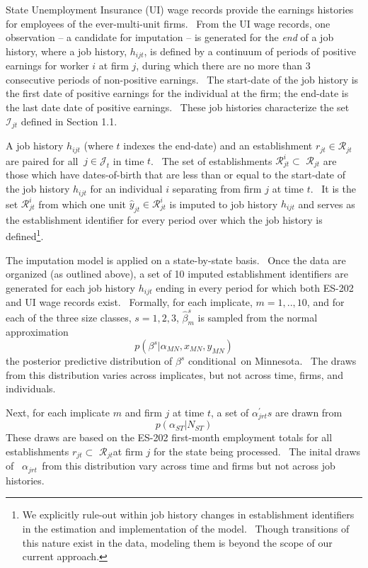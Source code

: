 State Unemployment Insurance (UI) wage records provide the earnings
histories for employees of the ever-multi-unit firms.  \ From the UI wage
records, one observation -- a candidate for imputation --  is generated for
the \emph{end} of a job history, where a job history,  $h_{ijt}$, is defined
by a continuum of periods of positive earnings for worker $i$ at firm $j$,
during which there are no more than 3 consecutive periods of non-positive
earnings. \ The start-date of the job history is the first date of positive
earnings for the individual at the firm; the end-date is the last date date
of positive earnings. \ These job histories characterize the set $\mathcal{I}%
_{jt}$ defined in Section 1.1. \ 

A job history $h_{ijt}$ (where $t$ indexes the end-date) and an
establishment $r_{jt}\in \mathcal{R}_{jt}$ are paired for all $\ j\in 
\mathcal{J}_{t}$ in time $t$. \ The set of establishments  $\mathcal{R}%
_{jt}^{i}\subset $ $\mathcal{R}_{jt}$ are those which have dates-of-birth
that are less than or equal to the start-date of the job history $h_{ijt}$
for an individual $i$ separating from firm $j$ at time $t$. \ It is the set $%
\mathcal{R}_{jt}^{i}$ from which one unit $\hat{y}_{jt}\in \mathcal{R}%
_{jt}^{i}$ is imputed to job history $h_{ijt}$ and serves as the
establishment identifier for every period over which the job history is
defined\footnote{%
We explicitly rule-out within job history changes in establishment
identifiers in the estimation and implementation of the model. \ Though
transitions of this nature exist in the data, modeling them is beyond the
scope of our current approach.}.

\bigskip The imputation model is applied on a state-by-state basis. \ Once
the data are organized (as outlined above), a set of 10 imputed
establishment identifiers are generated for each job history $h_{ijt}$
ending in every period for which both ES-202 and UI wage records exist. \
Formally, for each implicate, $m=1,..,10$, and for each of the three size
classes, $s=1,2,3$, $\hat{\beta}_{m}^{s}$ is sampled from the normal
approximation 
\begin{equation}
p(\beta ^{s}|\alpha _{MN},x_{MN},y_{MN})  \label{sample beta}
\end{equation}
the posterior predictive distribution of $\beta ^{s}$ conditional\ on
Minnesota. \ The draws from this distribution varies across implicates, but
not across time, firms, and individuals.

Next, for each implicate $m$ and firm $j$ at time $t$, a set of $\alpha
_{jrt}^{\prime }s$ are drawn from%
\begin{equation}
p\left( \alpha _{ST}|N_{ST}\right)   \label{sample alpha}
\end{equation}%
These draws are based on the ES-202 first-month employment totals for all
establishments $r_{jt}\subset $ $\mathcal{R}_{jt}$at firm $j$ for the state
being processed. \ The inital draws of \ $\alpha _{jrt\text{ }}$from this
distribution vary across time and firms but not across job histories. \ \ 

